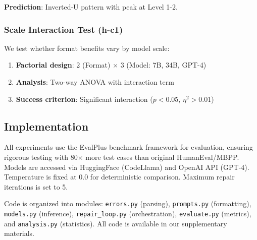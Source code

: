\textbf{Prediction}: Inverted-U pattern with peak at Level 1-2.

\subsubsection{Scale Interaction Test (h-c1)}

We test whether format benefits vary by model scale:

\begin{enumerate}
    \item \textbf{Factorial design}: 2 (Format) $\times$ 3 (Model: 7B, 34B, GPT-4)
    \item \textbf{Analysis}: Two-way ANOVA with interaction term
    \item \textbf{Success criterion}: Significant interaction ($p < 0.05$, $\eta^2 > 0.01$)
\end{enumerate}

\subsection{Implementation}

All experiments use the EvalPlus benchmark framework \citep{guo2024evalplus} for evaluation, ensuring rigorous testing with 80$\times$ more test cases than original HumanEval/MBPP. Models are accessed via HuggingFace (CodeLlama) and OpenAI API (GPT-4). Temperature is fixed at 0.0 for deterministic comparison. Maximum repair iterations is set to 5.

Code is organized into modules: \texttt{errors.py} (parsing), \texttt{prompts.py} (formatting), \texttt{models.py} (inference), \texttt{repair\_loop.py} (orchestration), \texttt{evaluate.py} (metrics), and \texttt{analysis.py} (statistics). All code is available in our supplementary materials.
